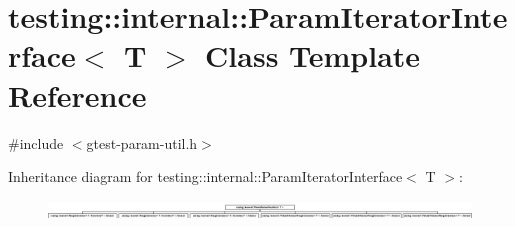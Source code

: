 \hypertarget{classtesting_1_1internal_1_1_param_iterator_interface}{}\section{testing\+::internal\+::Param\+Iterator\+Interface$<$ T $>$ Class Template Reference}
\label{classtesting_1_1internal_1_1_param_iterator_interface}


{\ttfamily \#include $<$gtest-\/param-\/util.\+h$>$}

Inheritance diagram for testing\+::internal\+::Param\+Iterator\+Interface$<$ T $>$\+:\begin{figure}[H]
\begin{center}
\leavevmode
\includegraphics[height=0.505872cm]{d9/db9/classtesting_1_1internal_1_1_param_iterator_interface}
\end{center}
\end{figure}
